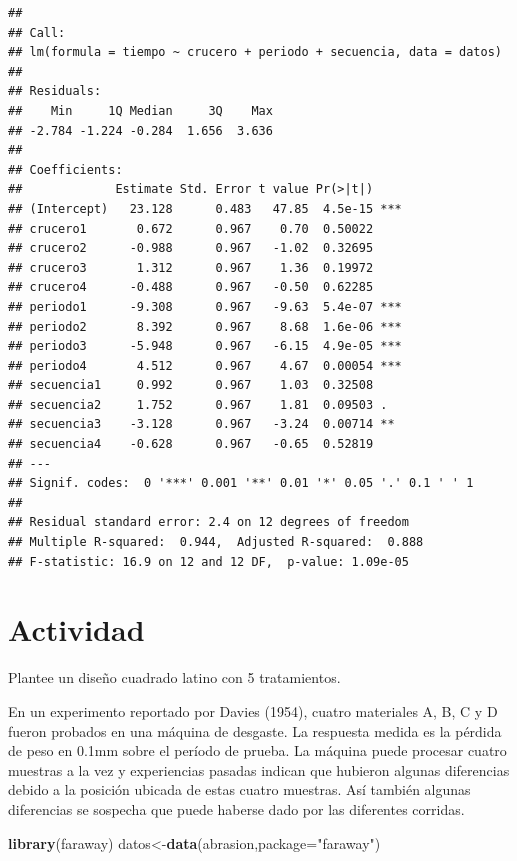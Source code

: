 \documentclass[]{book}
\newenvironment{Shaded}{\begin{snugshade}}{\end{snugshade}}
\newcommand{\KeywordTok}[1]{\textcolor[rgb]{0.13,0.29,0.53}{\textbf{#1}}}
\newcommand{\DataTypeTok}[1]{\textcolor[rgb]{0.13,0.29,0.53}{#1}}
\newcommand{\StringTok}[1]{\textcolor[rgb]{0.31,0.60,0.02}{#1}}
\newcommand{\NormalTok}[1]{#1}
\begin{document}
\begin{verbatim}
## 
## Call:
## lm(formula = tiempo ~ crucero + periodo + secuencia, data = datos)
## 
## Residuals:
##    Min     1Q Median     3Q    Max 
## -2.784 -1.224 -0.284  1.656  3.636 
## 
## Coefficients:
##             Estimate Std. Error t value Pr(>|t|)    
## (Intercept)   23.128      0.483   47.85  4.5e-15 ***
## crucero1       0.672      0.967    0.70  0.50022    
## crucero2      -0.988      0.967   -1.02  0.32695    
## crucero3       1.312      0.967    1.36  0.19972    
## crucero4      -0.488      0.967   -0.50  0.62285    
## periodo1      -9.308      0.967   -9.63  5.4e-07 ***
## periodo2       8.392      0.967    8.68  1.6e-06 ***
## periodo3      -5.948      0.967   -6.15  4.9e-05 ***
## periodo4       4.512      0.967    4.67  0.00054 ***
## secuencia1     0.992      0.967    1.03  0.32508    
## secuencia2     1.752      0.967    1.81  0.09503 .  
## secuencia3    -3.128      0.967   -3.24  0.00714 ** 
## secuencia4    -0.628      0.967   -0.65  0.52819    
## ---
## Signif. codes:  0 '***' 0.001 '**' 0.01 '*' 0.05 '.' 0.1 ' ' 1
## 
## Residual standard error: 2.4 on 12 degrees of freedom
## Multiple R-squared:  0.944,  Adjusted R-squared:  0.888 
## F-statistic: 16.9 on 12 and 12 DF,  p-value: 1.09e-05
\end{verbatim}

\section{Actividad}\label{actividad-4}

Plantee un diseño cuadrado latino con 5 tratamientos.

En un experimento reportado por Davies (1954), cuatro materiales A, B, C
y D fueron probados en una máquina de desgaste. La respuesta medida es
la pérdida de peso en 0.1mm sobre el período de prueba. La máquina puede
procesar cuatro muestras a la vez y experiencias pasadas indican que
hubieron algunas diferencias debido a la posición ubicada de estas
cuatro muestras. Así también algunas diferencias se sospecha que puede
haberse dado por las diferentes corridas.

\begin{Shaded}
\begin{Highlighting}[]
\KeywordTok{library}\NormalTok{(faraway)}
\NormalTok{datos<-}\KeywordTok{data}\NormalTok{(abrasion,}\DataTypeTok{package=}\StringTok{"faraway"}\NormalTok{)}
\end{Highlighting}
\end{Shaded}
\end{document}
